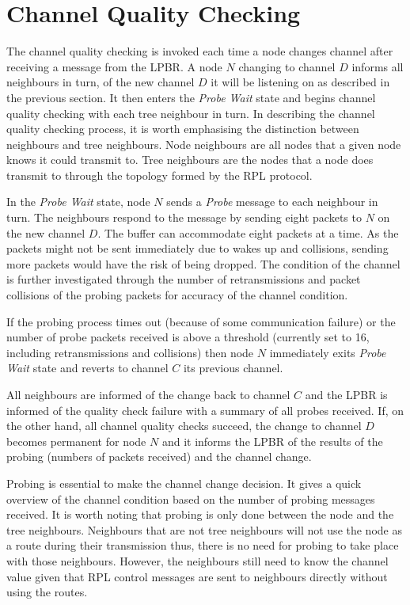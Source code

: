 \section{Channel Quality Checking}
The channel quality checking is invoked each time a node changes channel after receiving a message from the LPBR. A node $N$ changing to channel $D$ informs all neighbours in turn, of the new channel $D$ it will be listening on as described in the previous section. It then enters the \emph{Probe Wait} state and begins channel quality checking with each tree neighbour in turn. In describing the channel quality checking process, it is worth emphasising the  distinction between neighbours and tree neighbours. Node neighbours are all nodes that a given node knows it could transmit to. Tree neighbours are the nodes that a node does transmit to through the topology formed by the RPL protocol. 

In the \emph{Probe Wait} state, node $N$ sends a \emph{Probe} message to each neighbour in turn. The neighbours respond to the message by sending eight packets to $N$ on the new channel $D$. 
The buffer can accommodate eight packets at a time. As the packets might not be sent immediately due to wakes up and collisions, sending more packets would have the risk of being dropped. 
The condition of the channel is further investigated through the number of retransmissions and packet collisions of the probing packets for accuracy of the channel condition. 

If the probing process times out (because of some communication failure) or the number of probe packets received is above a threshold (currently set to 16, including retransmissions and collisions) then node $N$ immediately exits \emph{Probe Wait} state and reverts to channel $C$ its previous channel. 


All neighbours are informed of the change back to channel $C$ and the LPBR is informed of the quality check failure with a summary of all probes received.
If, on the other hand, all channel quality checks succeed, the change to channel $D$ becomes permanent for node $N$ and it informs the LPBR of the results of the probing (numbers of packets received) and the channel change.

Probing is essential to make the channel change decision. It gives a quick overview of the channel condition based on the number of probing messages received. It is worth noting that probing is only done between the node and the tree neighbours. Neighbours that are not tree neighbours will not use the node as a route during their transmission thus, there is no need for probing to take place with those neighbours. However, the neighbours still need to know the channel value given that RPL control messages are sent to neighbours directly without using the routes.

